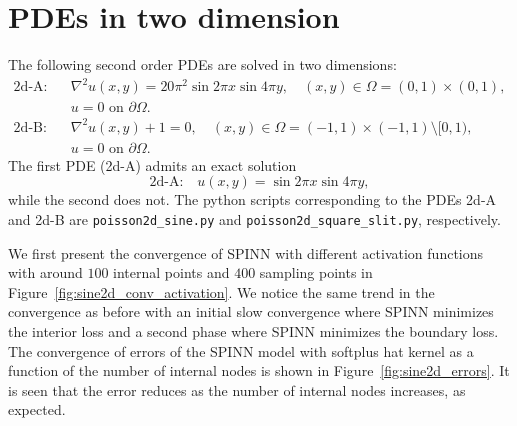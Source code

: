 \documentclass[12pt]{article}
\newcommand{\code}[1]{\lstinline{#1}}
\begin{document}
\section{PDEs in two dimension}
The following second order PDEs are solved in two dimensions:
\begin{displaymath}
\begin{split}
\text{2d-A:}\quad& \nabla^2 u(x,y) = 20\pi^2 \sin 2\pi x \sin 4\pi y, \quad (x, y) \in \Omega = (0,1) \times (0,1),\\
 & u = 0 \text{ on } \partial \Omega.\\
\text{2d-B:}\quad& \nabla^2 u(x,y) + 1 = 0, \quad (x,y) \in \Omega = (-1,1) \times (-1,1) \setminus [0,1),\\
 & u = 0 \text{ on } \partial \Omega.
\end{split}
\end{displaymath}
The first PDE (2d-A) admits an exact solution
\begin{displaymath}
\text{2d-A:}\quad u(x,y) = \sin 2\pi x \sin 4 \pi y,
\end{displaymath}
while the second does not. The python scripts corresponding to the PDEs 2d-A and 2d-B are \code{poisson2d_sine.py} and \code{poisson2d_square_slit.py}, respectively.

We first present the convergence of SPINN with different activation functions with around $100$ internal points and $400$ sampling points in Figure~\ref{fig:sine2d_conv_activation}. We notice the same trend in the convergence as before with an initial slow convergence where SPINN minimizes the interior loss and a second phase where SPINN minimizes the boundary loss. The convergence of errors of the SPINN model with softplus hat kernel as a function of the number of internal nodes is shown in Figure~\ref{fig:sine2d_errors}. It is seen that the error reduces as the number of internal nodes increases, as expected.
\end{document}
